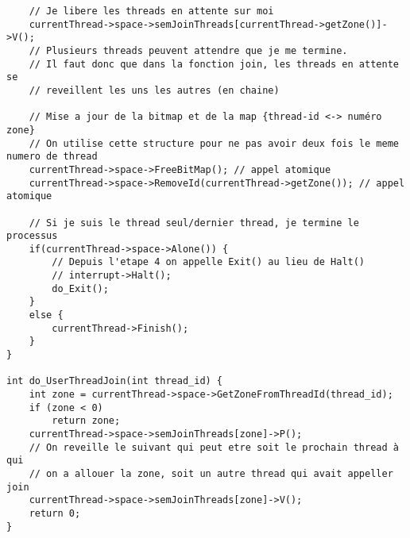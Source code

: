 \documentclass[a4paper,10pt]{article}
\begin{document}
\begin{lstlisting}
    // Je libere les threads en attente sur moi
    currentThread->space->semJoinThreads[currentThread->getZone()]->V();
    // Plusieurs threads peuvent attendre que je me termine.
    // Il faut donc que dans la fonction join, les threads en attente se
    // reveillent les uns les autres (en chaine)

    // Mise a jour de la bitmap et de la map {thread-id <-> numéro zone}
    // On utilise cette structure pour ne pas avoir deux fois le meme numero de thread
    currentThread->space->FreeBitMap(); // appel atomique
    currentThread->space->RemoveId(currentThread->getZone()); // appel atomique

    // Si je suis le thread seul/dernier thread, je termine le processus
    if(currentThread->space->Alone()) {
        // Depuis l'etape 4 on appelle Exit() au lieu de Halt()
        // interrupt->Halt();
        do_Exit();
    }
    else {
        currentThread->Finish();
    }
}

int do_UserThreadJoin(int thread_id) {
    int zone = currentThread->space->GetZoneFromThreadId(thread_id);
    if (zone < 0)
        return zone;
    currentThread->space->semJoinThreads[zone]->P();
    // On reveille le suivant qui peut etre soit le prochain thread à qui
    // on a allouer la zone, soit un autre thread qui avait appeller join
    currentThread->space->semJoinThreads[zone]->V();
    return 0;
}
\end{lstlisting}
\end{document}
